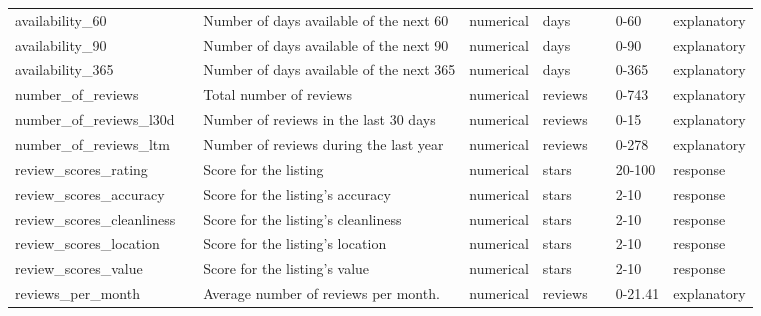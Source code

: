 \begin{center}
\begin{xltabular}{\textwidth}{llXlllll}
availability\_60            &                             &  Number of days available of the next 60 & numerical   & days           &                             &                     0-60    & explanatory \\
availability\_90            &                             &  Number of days available of the next 90  & numerical   & days           &                             &                     0-90    & explanatory \\
availability\_365           &                             &  Number of days available of the next 365  & numerical   & days           &                             &                     0-365   & explanatory \\
number\_of\_reviews         &                             & Total number of reviews & numerical   & reviews        &                             &                     0-743   & explanatory \\
number\_of\_reviews\_l30d   &                             & Number of reviews in the last 30 days & numerical   & reviews        &                             &                     0-15    & explanatory \\
number\_of\_reviews\_ltm     &                             & Number of reviews during the last year & numerical   & reviews        &                             &                     0-278   & explanatory \\
review\_scores\_rating       &                             & Score for the listing & numerical   & stars          &                             &                     20-100  & response \\
review\_scores\_accuracy     &                             & Score for the listing's accuracy & numerical   & stars          &                             &                     2-10    & response \\
review\_scores\_cleanliness  &                             & Score for the listing's cleanliness & numerical   & stars          &                             &                     2-10    & response \\
review\_scores\_location     &                             & Score for the listing's location & numerical   & stars          &                             &                     2-10    & response \\
review\_scores\_value        &                             & Score for the listing's value & numerical   & stars          &                             &                     2-10    & response \\
reviews\_per\_month         &                             & Average number of reviews per month. & numerical   & reviews        &                             &                     0-21.41 & explanatory
\end{xltabular}

\end{center}
